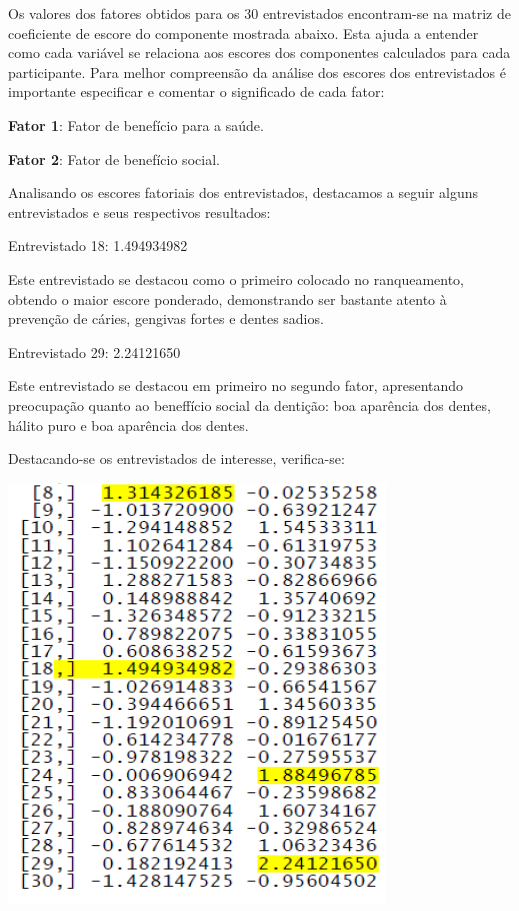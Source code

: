 \documentclass[12pt,brazil,]{book}
\begin{document}
Os valores dos fatores obtidos para os 30 entrevistados encontram-se na
matriz de coeficiente de escore do componente mostrada abaixo. Esta
ajuda a entender como cada variável se relaciona aos escores dos
componentes calculados para cada participante. Para melhor compreensão
da análise dos escores dos entrevistados é importante especificar e
comentar o significado de cada fator:

\textbf{Fator 1}: Fator de benefício para a saúde.

\textbf{Fator 2}: Fator de benefício social.

Analisando os escores fatoriais dos entrevistados, destacamos a seguir
alguns entrevistados e seus respectivos resultados:

Entrevistado 18: 1.494934982

Este entrevistado se destacou como o primeiro colocado no ranqueamento,
obtendo o maior escore ponderado, demonstrando ser bastante atento à
prevenção de cáries, gengivas fortes e dentes sadios.

Entrevistado 29: 2.24121650

Este entrevistado se destacou em primeiro no segundo fator, apresentando
preocupação quanto ao beneffício social da dentição: boa aparência dos
dentes, hálito puro e boa aparência dos dentes.

Destacando-se os entrevistados de interesse, verifica-se:

\includegraphics{anfat2.png}

\printbibliography[segment=\therefsegment,heading=subbibliography]
\end{document}
